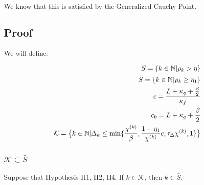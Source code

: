 We know that this is satisfied by the Generalized Cauchy Point.



\subsection{Proof}



We will define:


\begin{align*}
S = \{k \in \mathbb N | \rho_k > \eta \} \\
\bar{S} = \{k \in \mathbb N | \rho_k \ge \eta_1 \} \\
c = \frac{L + \kappa_{g} + \frac {\beta} 2}{\kappa_f} \\
c_0 = L + \kappa_{g} + \frac {\beta} 2 \\
\mathcal K = \big \{ k \in \mathbb N | \Delta_k \le \min \{ \frac {{\chi^{(k)}}}{\beta}, \frac{1-\eta_1}{{\chi^{(k)}}}c, \tau_{\Delta} {\chi^{(k)}}, 1 \} \big \}
\end{align*}



\subsubsection{$\mathcal K \subset \bar{S}$}
\begin{theorem}
Suppose that Hypothesis H1, H2, H4. If $k \in \mathcal K$, then $k \in \bar{S}$.
\end{theorem}
 

